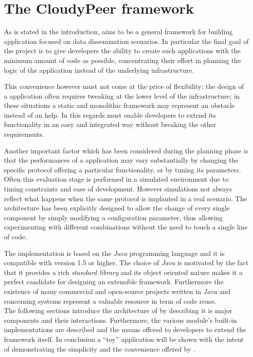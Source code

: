 \chapter{The CloudyPeer framework}
As is stated in the
introduction, \cloudypeer aims to be a general framework for building
\ptop application focused on data dissemination scenarios.
In particular the final goal of the project is to give developers the
ability to create such applications with the minimum amount of code as
possible, concentrating their effort in planning the logic of the
application instead of the underlying \ptop infrastructure.

This convenience however must not come at the price of
flexibility: the design of a \ptop application often requires
tweaking at the lower level of the infrastructure; in these situations
a static and monolithic framework may represent an obstacle instead of
an help.
In this regards \cloudypeer must enable developers to extend its
functionality in an easy and integrated way without breaking the other
requirements.

Another important factor which has been considered during the
planning phase is that the performances of a \ptop application may
vary substantially by changing the specific protocol offering a
particular functionality, or by tuning its parameters. Often this
evaluation stage is performed in a simulated environment due to timing
constraints and ease of development. However simulations not always
reflect what happens when the same protocol is implanted in a real
scenario.
The \cloudypeer architecture has been explicitly designed to allow the change
of every single component by simply modifying a configuration
parameter, thus allowing experimenting with different
combinations without the need to touch a single line of code.

The implementation is based on the \emph{Java} programming language
and it is compatible with version 1.5 or higher. The
choice of \emph{Java} is motivated by the fact that it provides a rich
\emph{standard library} and its object oriented nature makes it a
perfect candidate for designing an extensible framework. Furthermore
the existence of many commercial and open-source projects written in
\emph{Java} and concerning \ptop systems represent a valuable resource
in term of code reuse.
\ \\
The following sections introduce the architecture of
\cloudypeer by describing it is major components and their interactions.
Furthermore, the various module's built-in implementations are described
and the means offered to developers to extend
the framework itself.
In conclusion a ``toy'' application will be shown with the intent of
demonstrating the simplicity and the convenience offered by
\cloudypeer.

